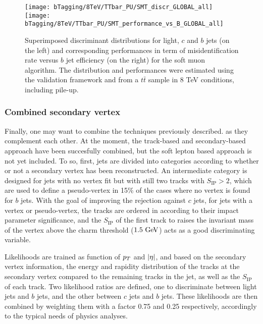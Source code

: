     \begin{figure}[th!]
        \centering
        \begin{minipage}{\textwidth}
        \texttt{[image: bTagging/8TeV/TTbar\_PU/SMT\_discr\_GLOBAL\_all]}
        \texttt{[image: bTagging/8TeV/TTbar\_PU/SMT\_performance\_vs\_B\_GLOBAL\_all]}
        \end{minipage}
        \caption{Superimposed discriminant distributions for light, $c$ and $b$ jets (on
        the left) and corresponding performances in term of misidentification rate versus $b$ jet efficiency
        (on the right) for the soft muon algorithm.
        The distribution and performances were estimated using the validation framework and from
        a $t\bar{t}$ sample in 8 TeV conditions, including pile-up.}
        \label{fig:bTagging/perfSMT}
    \end{figure}

        \subsubsection{Combined secondary vertex}

    Finally, one may want to combine the techniques previously described. as they complement
    each other. At the moment, the track-based and secondary-based approach have been
    succesfully combined, but the soft lepton based approach is not yet included.
    To so, first, jets are divided into categories according to whether or not a secondary
    vertex has been reconstructed. An intermediate category is designed for jets
    with no vertex fit but with still two tracks with $S_\text{IP} > 2$, which are used to
    define a pseudo-vertex in 15\% of the cases where no vertex is found for $b$ jets.
    With the goal of improving the rejection against $c$ jets, for jets with a vertex or pseudo-vertex,
    the tracks are ordered in according to their impact parameter significance, and the
    $S_\text{IP}$ of the first track to raises the invariant mass of the vertex above
    the charm threshold ($1.5 ~\text{GeV}$) acts as a good discriminating variable.

    Likelihoods are trained as function of $p_T$ and $\left| \eta \right|$, and based on the secondary vertex information, the energy
    and rapidity distribution of the tracks at the secondary vertex compared to the remaining
    tracks in the jet, as well as the $S_\text{IP}$ of each track. Two likelihood ratios
    are defined, one to discriminate between light jets and $b$ jets, and the other between
    $c$ jets and $b$ jets.
    These likelihoods are then combined by weighting them with a factor 0.75 and 0.25
    respectively, accordingly to the typical needs of physics analyses.

